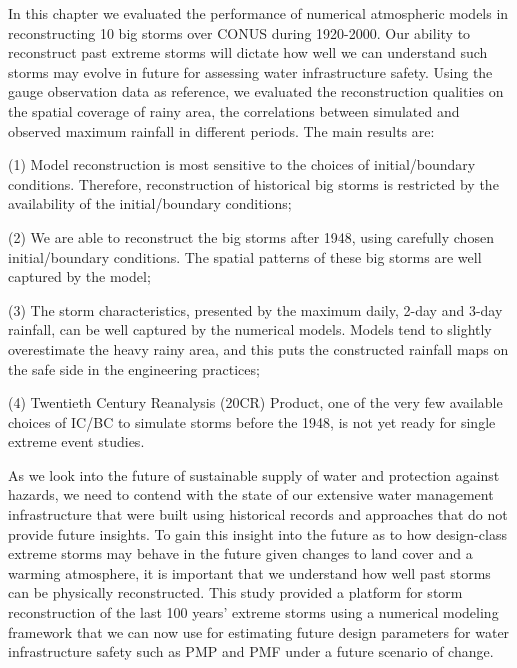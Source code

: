 In this chapter we evaluated the performance of numerical atmospheric models in reconstructing 10 big storms over CONUS during 1920-2000. Our ability to reconstruct past extreme storms will dictate how well we can understand such storms may evolve in future for assessing water infrastructure safety. Using the gauge observation data as reference, we evaluated the reconstruction qualities on the spatial coverage of rainy area, the correlations between simulated and observed maximum rainfall in different periods. The main results are:

(1) Model reconstruction is most sensitive to the choices of initial/boundary conditions. Therefore, reconstruction of historical big storms is restricted by the availability of the initial/boundary conditions;

(2) We are able to reconstruct the big storms after 1948, using carefully chosen initial/boundary conditions. The spatial patterns of these big storms are well captured by the model;

(3) The storm characteristics, presented by the maximum daily, 2-day and 3-day rainfall, can be well captured by the numerical models. Models tend to slightly overestimate the heavy rainy area, and this puts the constructed rainfall maps on the safe side in the engineering practices;

(4) Twentieth Century Reanalysis (20CR) Product, one of the very few available choices of IC/BC to simulate storms before the 1948, is not yet ready for single extreme event studies. 

As we look into the future of sustainable supply of water and protection against hazards, we need to contend with the state of our extensive water management infrastructure that were built using historical records and approaches that do not provide future insights. To gain this insight into the future as to how design-class extreme storms may behave in the future given changes to land cover and a warming atmosphere, it is important that we understand how well past storms can be physically reconstructed. This study provided a platform for storm reconstruction of the last 100 years’ extreme storms using a numerical modeling framework that we can now use for estimating future design parameters for water infrastructure safety such as PMP and PMF under a future scenario of change.

